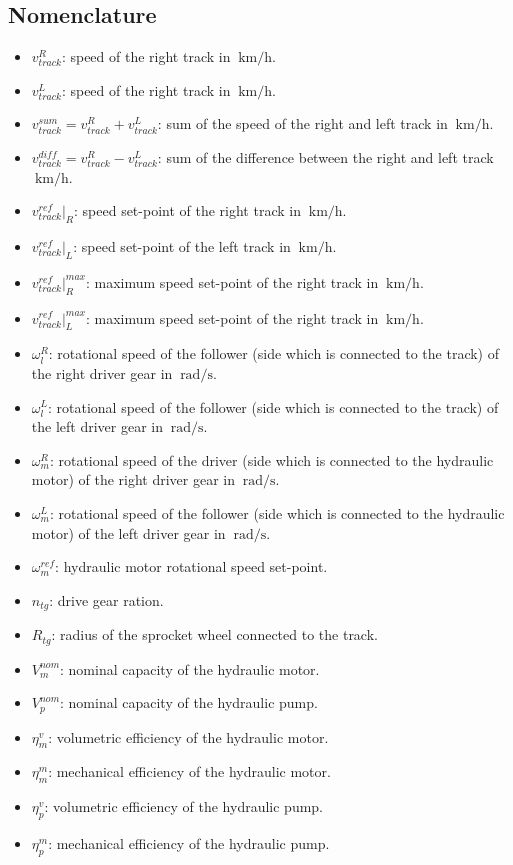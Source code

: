 \documentclass[12pt,a4paper,oneside]{book}
\begin{document}
\begin{onehalfspace}
\section{Nomenclature}
\begin{itemize}
	\item[--] $v_{track}^{R}$: speed of the right track in $\SI{}{\kilo\meter\per\hour}$.
	\item[--] $v_{track}^{L}$: speed of the right track in $\SI{}{\kilo\meter\per\hour}$.
	\item[--] $v_{track}^{sum}=v_{track}^{R}+v_{track}^{L}$: sum of the speed of the right and left track in $\SI{}{\kilo\meter\per\hour}$.
	\item[--] $v_{track}^{diff}=v_{track}^{R}-v_{track}^{L}$: sum of the difference between the right and left track $\SI{}{\kilo\meter\per\hour}$.
	\item[--] $v_{track}^{ref}\Big|_{R}$: speed set-point of the right track in $\SI{}{\kilo\meter\per\hour}$.
	\item[--] $v_{track}^{ref}\Big|_{L}$: speed set-point of the left track in $\SI{}{\kilo\meter\per\hour}$.
	\item[--] $v_{track}^{ref}\Big|_{R}^{max}$: maximum speed set-point of the right track in $\SI{}{\kilo\meter\per\hour}$.
	\item[--] $v_{track}^{ref}\Big|_{L}^{max}$: maximum speed set-point of the right track in $\SI{}{\kilo\meter\per\hour}$.
	\item[--] $\omega_l^R$: rotational speed of the follower (side which is connected to the track) of the right driver gear in $\SI{}{\radian\per\second}$.
	\item[--] $\omega_l^L$: rotational speed of the follower (side which is connected to the track) of the left driver gear in $\SI{}{\radian\per\second}$.
	\item[--] $\omega_m^R$: rotational speed of the driver (side which is connected to the hydraulic motor) of the right driver gear in $\SI{}{\radian\per\second}$.
	\item[--] $\omega_m^L$: rotational speed of the follower (side which is connected to the hydraulic motor) of the left driver gear in $\SI{}{\radian\per\second}$.
	\item[--] $\omega_m^{ref}$: hydraulic motor rotational speed set-point.
	\item[--] $n_{tg}$: drive gear ration.
	\item[--] $R_{tg}$: radius of the sprocket wheel connected to the track.
	\item[--] $V_m^{nom}$: nominal capacity of the hydraulic motor.
	\item[--] $V_p^{nom}$: nominal capacity of the hydraulic pump.
	\item[--] $\eta_m^{v}$: volumetric efficiency of the hydraulic motor.
	\item[--] $\eta_m^{m}$: mechanical efficiency of the hydraulic motor.
	\item[--] $\eta_p^{v}$: volumetric efficiency of the hydraulic pump.
	\item[--] $\eta_p^{m}$: mechanical efficiency of the hydraulic pump.
	

\end{itemize}
\end{onehalfspace}
\end{document}
